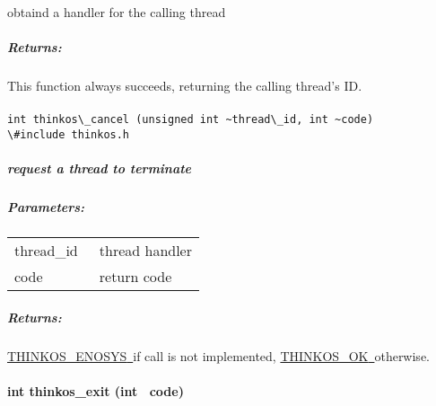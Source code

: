 {obtaind a handler for the calling thread }

{}

\subparagraph{\texorpdfstring{{Returns:}}{Returns:}}\label{returns-2}

{This function always succeeds, returning the calling thread's ID. }

\paragraph{}

{\lstinline{int thinkos\_cancel (unsigned int ~thread\_id, int ~code)}\\

{\lstinline{\#include thinkos.h}}\\

\subparagraph{request a thread to terminate }

{}

\subparagraph{\texorpdfstring{{Parameters:}}{Parameters:}}\label{parameters-2}

\protect\hypertarget{t.92b92c82f7d931014629a9c6b6ef3d6c02d24480}{}{}\protect\hypertarget{t.2}{}{}

\begin{longtable}[]{@{}ll@{}}
\toprule
\begin{minipage}[t]{0.47\columnwidth}\raggedright\strut
{thread\_id}{~}\strut
\end{minipage} & \begin{minipage}[t]{0.47\columnwidth}\raggedright\strut
{thread handler }\strut
\end{minipage}\tabularnewline
\begin{minipage}[t]{0.47\columnwidth}\raggedright\strut
{code}{~}\strut
\end{minipage} & \begin{minipage}[t]{0.47\columnwidth}\raggedright\strut
{return code }\strut
\end{minipage}\tabularnewline
\bottomrule
\end{longtable}

\subparagraph{\texorpdfstring{{Returns:}}{Returns:}}\label{returns-3}

{\protect\hyperlink{h.3s49zyc}{THINKOS\_ENOSYS}}{\protect\hyperlink{h.3s49zyc}{~}}{if
call is not implemented,
}{\protect\hyperlink{h.2fk6b3p}{THINKOS\_OK}}{\protect\hyperlink{h.2fk6b3p}{~}}{otherwise.
}

\paragraph{\texorpdfstring{{int thinkos\_exit (int
~code)}}{int thinkos\_exit (int ~code)}}\label{int-thinkos_exit-int-code}

}
